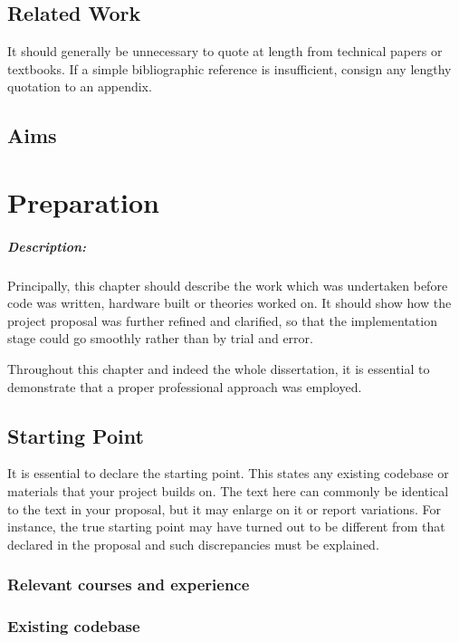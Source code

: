 \documentclass[12pt,a4paper,twoside,openright]{report}
\begin{document}
\section{Related Work}
It should generally be unnecessary to quote at length from technical papers or textbooks.
If a simple bibliographic reference is insufficient, consign any lengthy quotation to an appendix.
\section{Aims}


\chapter{Preparation}
\paragraph{Description: }
Principally, this chapter should describe the work which was undertaken before code was written, hardware built or theories worked on. 
It should show how the project proposal was further refined and clarified, so that the implementation stage could go smoothly rather than by trial and error.
\par
Throughout this chapter and indeed the whole dissertation, it is essential to demonstrate that a proper professional approach was employed.
\par

\section{Starting Point}
It is essential to declare the starting point. 
This states any existing codebase or materials that your project builds on. 
The text here can commonly be identical to the text in your proposal, but it may enlarge on it or report variations.
For instance, the true starting point may have turned out to be different from that declared in the proposal and such discrepancies must be explained.

\subsection{Relevant courses and experience}

\subsection{Existing codebase}
\end{document}
